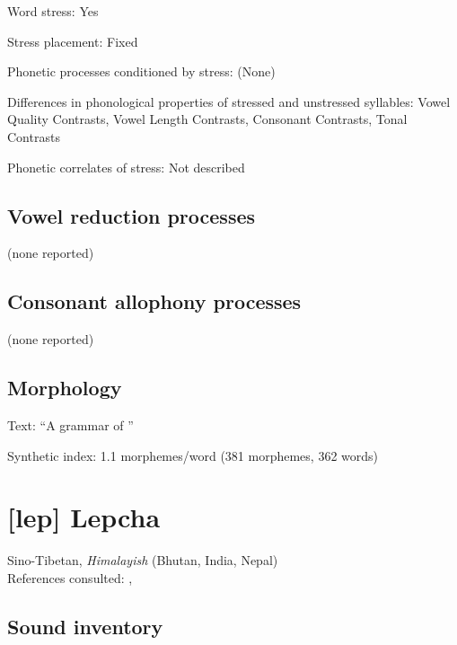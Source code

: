 {\begin{appendixdesc}
\item[Word stress:] Yes

\item[Stress placement:] Fixed

\item[Phonetic processes conditioned by stress:] (None)

\item[Differences in phonological properties of stressed and unstressed syllables:] Vowel Quality Contrasts, Vowel Length Contrasts, Consonant Contrasts, Tonal Contrasts

\item[Phonetic correlates of stress:] Not described
\end{appendixdesc}
\subsection*{Vowel reduction processes}

(none reported)
\subsection*{Consonant allophony processes}

(none reported)
\subsection*{Morphology}

\begin{appendixdesc}

\item[Text:] “A grammar of ” \citep[488--497]{Enfield2007}

\item[Synthetic index:] 1.1 morphemes/word (381 morphemes, 362 words)
\end{appendixdesc}
\section*{[lep] Lepcha}   %
Sino-Tibetan, \textit{Himalayish} (Bhutan, India, Nepal)\medskip\\
References consulted: \citet{Plaisier2007}, \citet{Sprigg1966}
\subsection*{Sound inventory}
\begin{appendixdesc}


\end{appendixdesc}}
